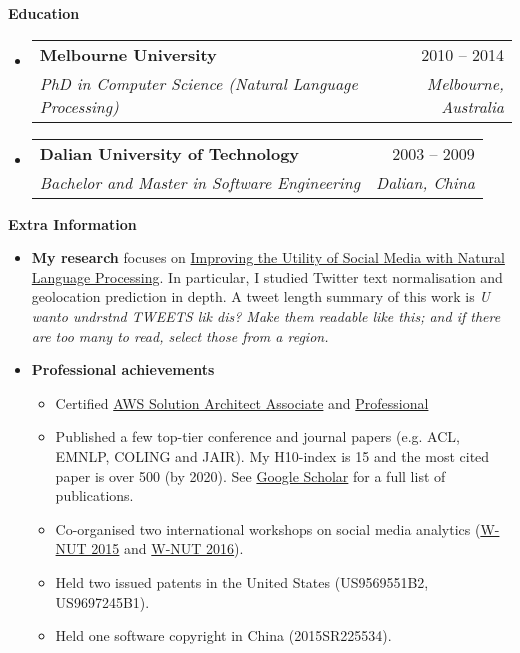 \documentclass[letterpaper,12pt]{article}[leftmargin=*]
\makeatletter
\def \entryspacing {-0pt}
\renewcommand{\section}[2]{\vspace{5pt}
  \colorbox{secondary}{\color{white}\raggedbottom\normalsize\textbf{{#1}{\hspace{7pt}#2}}}
}
\newcommand{\resumeEntryStart}{\begin{itemize}[leftmargin=2.5mm]}
\newcommand{\resumeEntryEnd}{\end{itemize}\vspace{\entryspacing}}
\newcommand{\resumeItemListStart}{\begin{itemize}[leftmargin=4.5mm]}
\newcommand{\resumeItemListEnd}{\end{itemize}}
\newcommand{\resumeItem}[1]{
  \item\small{
    {#1 \vspace{-2pt}}
  }
}
\newcommand{\resumeEntryTSDL}[4]{
  \vspace{-1pt}\item[]
    \begin{tabularx}{0.97\textwidth}{X@{\hspace{60pt}}r}
      \textbf{\color{primary}#1} & {\firabook\color{accent}\small#2} \\
      \textit{\color{accent}\small#3} & \textit{\color{accent}\small#4} \\
    \end{tabularx}\vspace{-6pt}
}
\newcommand{\resumeEntryS}[2]{
  \item[]\small{
    \textbf{\color{primary}#1 }{ #2 \vspace{-6pt}}
  }
}
\makeatother
\begin{document}
\section{\faGraduationCap}{Education}

  \resumeEntryStart
    \resumeEntryTSDL
      {Melbourne University}{2010 -- 2014}
      {PhD in Computer Science (Natural Language Processing)}{Melbourne, Australia}
    \resumeEntryTSDL
      {Dalian University of Technology}{2003 -- 2009}
      {Bachelor and Master in Software Engineering}{Dalian, China}
  \resumeEntryEnd

\section{\faGears}{Extra Information}

 \resumeEntryStart
  \resumeEntryS{My research}{focuses on \href{https://minerva-access.unimelb.edu.au/bitstream/handle/11343/41029/thesis.pdf?sequence=1}{Improving the Utility of Social Media with Natural Language Processing}. In particular, I studied Twitter text normalisation and geolocation prediction in depth. A tweet length summary of this work is \textit{U wanto undrstnd TWEETS lik dis? Make them readable like this; and if there are too many to read, select those from a region.}}
\resumeEntryS{Professional achievements}{
    \resumeItemListStart
      \resumeItem {Certified \href{https://www.youracclaim.com/badges/c7ac42bd-fe9a-4f13-83b3-80cea3a8cc57/public_url}{AWS Solution Architect Associate} and \href{https://www.youracclaim.com/badges/f7d5a6a9-caaf-472c-b703-207ae1046147/public_url}{Professional}}
      \resumeItem {Published a few top-tier conference and journal papers (e.g. ACL, EMNLP, COLING and JAIR). My H10-index is 15 and the most cited paper is over 500 (by 2020). See \href{https://scholar.google.com/citations?hl=en&user=ZRr4vn8AAAAJ}{Google Scholar} for a full list of publications.}
      \resumeItem {Co-organised two international workshops on social media analytics (\href{https://noisy-text.github.io/2015/}{W-NUT 2015} and \href{https://noisy-text.github.io/2015/}{W-NUT 2016}).}
      \resumeItem {Held two issued patents in the United States (US9569551B2, US9697245B1).}
      \resumeItem {Held one software copyright in China (2015SR225534).}
    \resumeItemListEnd}

 \resumeEntryEnd
\end{document}
